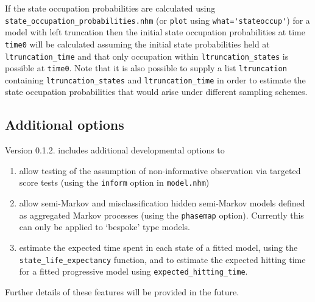 \documentclass{article}
\numberwithin{equation}{section}
\begin{document}
If the state occupation probabilities are calculated using \verb!state_occupation_probabilities.nhm! (or \verb!plot! using \verb!what='stateoccup'!) for a model with left truncation then the initial state occupation probabilities at time \verb!time0! will be calculated assuming the initial state probabilities held at \verb!ltruncation_time! and that only occupation within \verb!ltruncation_states! is possible at \verb!time0!. Note that it is also possible to supply a list \verb!ltruncation! containing \verb!ltruncation_states! and \verb!ltruncation_time! in order to estimate the state occupation probabilities that would arise under different sampling schemes.

\subsection{Additional options}
Version 0.1.2. includes additional developmental options to 
\begin{enumerate}
\item allow testing of the assumption of non-informative observation via targeted score tests (using the \verb!inform! option in \verb!model.nhm!)
\item allow semi-Markov and misclassification hidden semi-Markov models defined as aggregated Markov processes (using the \verb!phasemap! option). Currently this can only be applied to `bespoke' type models.
\item estimate the expected time spent in each state of a fitted model, using the \verb!state_life_expectancy! function, and to estimate the expected hitting time for a fitted progressive model using \verb!expected_hitting_time!.
\end{enumerate}
Further details of these features will be provided in the future.
\end{document}
